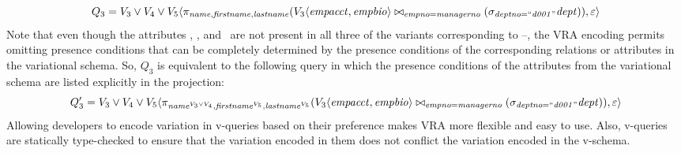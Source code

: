 \[
Q_3 = \vThree\vee\vFour\vee\vFive \langle
  \pi_{\name,\fname,\lname} 
(\joinRel{\chc[\vThree]{\empacct,\empbio}}{(\vSel[\deptno=\deptOne]{\dept})}
           {\empno=\managerno}),
  \empRel \rangle
\]  
%
Note that even though the attributes \name, \fname, and \lname\ are not present
in all three of the variants corresponding to \vThree--\vFive, the VRA encoding
permits omitting presence conditions that can be completely determined by the
presence conditions of the corresponding relations or attributes in the
variational schema. So, $Q_3$ is equivalent to the following query in which the
presence conditions of the attributes from the variational schema are listed
explicitly in the projection:
%
\[
Q_3' = \vThree\vee\vFour\vee\vFive \langle
  \pi_{\oatt{\name}{\vThree\vee\vFour},\oatt{\fname}{\vFive},\oatt{\lname}{\vFive}} 
  (\joinRel{\chc[\vThree]{\empacct,\empbio}}{(\vSel[\deptno=\deptOne]{\dept})}
           {\empno=\managerno}),
  \empRel \rangle
  \]
%
%
Allowing developers to encode variation in v-queries based on their
preference makes VRA more flexible and easy to use. 
Also, v-queries are statically type-checked to ensure that
the variation encoded in them does not conflict the variation encoded
in the v-schema. 

% 


%
